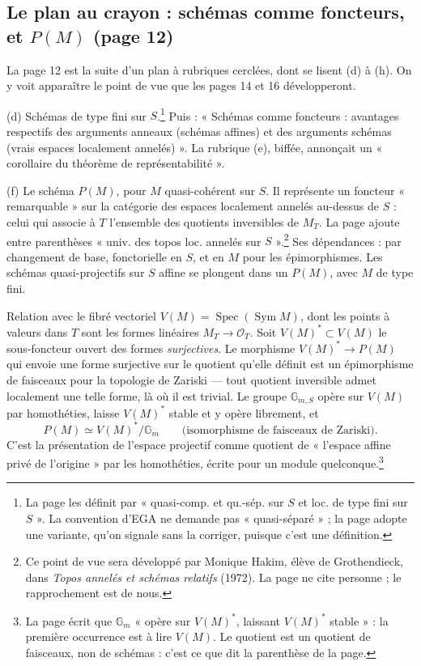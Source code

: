 \documentclass[11pt,a4paper]{article}
\begin{document}
\subsection*{Le plan au crayon : schémas comme foncteurs, et $P(M)$ (page 12)}

La page 12 est la suite d'un plan à rubriques cerclées, dont se lisent (d) à
(h). On y voit apparaître le point de vue que les pages 14 et 16 développeront.

(d) Schémas de type fini sur $S$.\footnote{La page les définit par
« quasi-comp. et qu.-sép. sur $S$ et loc. de type fini sur $S$ ». La
convention d'EGA ne demande pas « quasi-séparé » ; la page adopte une variante,
qu'on signale sans la corriger, puisque c'est une définition.} Puis : « Schémas
comme foncteurs : avantages respectifs des arguments anneaux (schémas affines)
et des arguments schémas (vrais espaces localement annelés) ». La rubrique (e),
biffée, annonçait un « corollaire du théorème de représentabilité ».

(f) Le schéma $P(M)$, pour $M$ quasi-cohérent sur $S$. Il représente un
foncteur « remarquable » sur la catégorie des espaces localement annelés
au-dessus de $S$ : celui qui associe à $T$ l'ensemble des quotients inversibles
de $M_T$. La page ajoute entre parenthèses « univ. des topos loc. annelés sur
$S$ ».\footnote{Ce point de vue sera développé par Monique Hakim, élève de
Grothendieck, dans \emph{Topos annelés et schémas relatifs} (1972). La page ne
cite personne ; le rapprochement est de nous.} Ses dépendances : par
changement de base, fonctorielle en $S$, et en $M$ pour les épimorphismes. Les
schémas quasi-projectifs sur $S$ affine se plongent dans un $P(M)$, avec $M$ de
type fini.

Relation avec le fibré vectoriel $V(M) = \operatorname{Spec}(\operatorname{Sym} M)$,
dont les points à valeurs dans $T$ sont les formes linéaires
$M_T \to \mathcal{O}_T$. Soit $V(M)^{*} \subset V(M)$ le sous-foncteur ouvert
des formes \emph{surjectives}. Le morphisme $V(M)^{*} \to P(M)$ qui envoie une
forme surjective sur le quotient qu'elle définit est un épimorphisme de
faisceaux pour la topologie de Zariski --- tout quotient inversible admet
localement une telle forme, là où il est trivial. Le groupe
$\mathbb{G}_{m,S}$ opère sur $V(M)$ par homothéties, laisse $V(M)^{*}$ stable
et y opère librement, et
\[
P(M) \simeq V(M)^{*} / \mathbb{G}_m \qquad \text{(isomorphisme de faisceaux de Zariski).}
\]
C'est la présentation de l'espace projectif comme quotient de « l'espace
affine privé de l'origine » par les homothéties, écrite pour un module
quelconque.\footnote{La page écrit que $\mathbb{G}_m$ « opère sur $V(M)^{*}$,
laissant $V(M)^{*}$ stable » : la première occurrence est à lire $V(M)$. Le
quotient est un quotient de faisceaux, non de schémas : c'est ce que dit la
parenthèse de la page.}
\end{document}
